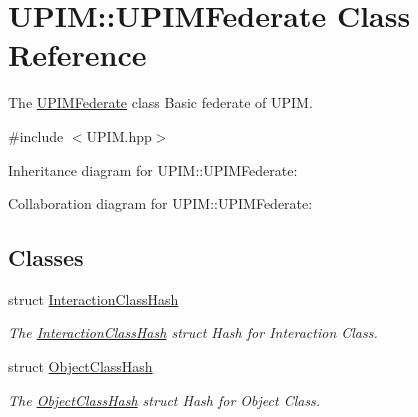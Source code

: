 \hypertarget{classUPIM_1_1UPIMFederate}{}\section{U\+P\+IM\+:\+:U\+P\+I\+M\+Federate Class Reference}
\label{classUPIM_1_1UPIMFederate}


The \hyperlink{classUPIM_1_1UPIMFederate}{U\+P\+I\+M\+Federate} class Basic federate of U\+P\+IM.  




{\ttfamily \#include $<$U\+P\+I\+M.\+hpp$>$}



Inheritance diagram for U\+P\+IM\+:\+:U\+P\+I\+M\+Federate\+:


Collaboration diagram for U\+P\+IM\+:\+:U\+P\+I\+M\+Federate\+:
\subsection*{Classes}
\begin{DoxyCompactItemize}
\item 
struct \hyperlink{structUPIM_1_1UPIMFederate_1_1InteractionClassHash}{Interaction\+Class\+Hash}
\begin{DoxyCompactList}\small\item\em The \hyperlink{structUPIM_1_1UPIMFederate_1_1InteractionClassHash}{Interaction\+Class\+Hash} struct Hash for Interaction Class. \end{DoxyCompactList}\item 
struct \hyperlink{structUPIM_1_1UPIMFederate_1_1ObjectClassHash}{Object\+Class\+Hash}
\begin{DoxyCompactList}\small\item\em The \hyperlink{structUPIM_1_1UPIMFederate_1_1ObjectClassHash}{Object\+Class\+Hash} struct Hash for Object Class. \end{DoxyCompactList}\end{DoxyCompactItemize}
